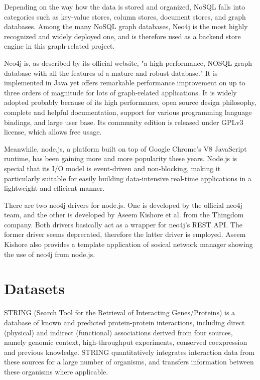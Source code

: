 \documentclass[10pt,conference,compsocconf]{../IEEEtran}
\begin{document}
Depending on the way how the data is stored and organized, NoSQL falls into categories such as key-value stores, column stores, document stores, and graph databases. Among the many NoSQL graph databases, Neo4j \citep{1076} is the most highly recognized and widely deployed one, and is therefore used as a backend store engine in this graph-related project.

Neo4j is, as described by its official website, "a high-performance, NOSQL graph database with all the features of a mature and robust database." It is implemented in Java yet offers remarkable performance improvement on up to three orders of magnitude for lots of graph-related applications. It is widely adopted probably because of its high performance, open source design philosophy, complete and helpful documentation, support for various programming language bindings, and large user base. Its community edition is released under GPLv3 license, which allows free usage.

Meanwhile, node.js, a platform built on top of Google Chrome's V8 JavaScript runtime, has been gaining more and more popularity these years. Node.js is special that its I/O model is event-driven and non-blocking, making it particularly suitable for easily building data-intensive real-time applications in a lightweight and efficient manner. 

There are two neo4j drivers for node.js. One is developed by the official neo4j team, and the other is developed by Aseem Kishore et al. from the Thingdom company. Both drivers basically act as a wrapper for neo4j's REST API. The former driver seems deprecated, therefore the latter driver is employed. Aseem Kishore also provides a template application of sosical network manager showing the use of neo4j from node.js.

\section{Datasets}

STRING (Search Tool for the Retrieval of Interacting Genes/Proteins) \citep{1070,1071,1072,1073,1074,1075} is a database of known and predicted protein-protein interactions, including direct (physical) and indirect (functional) associations derived from four sources, namely genomic context, high-throughput experiments, conserved coexpression and previous knowledge. STRING quantitatively integrates interaction data from these sources for a large number of organisms, and transfers information between these organisms where applicable.
\end{document}
